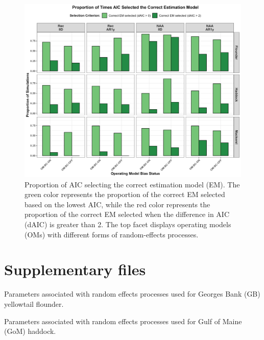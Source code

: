 \documentclass[
  12pt,
]{article}
\begin{document}
\begin{figure}[H]
\centering
\includegraphics[width=\textwidth]{Revised_Figures&Tables/AIC_select.PNG}
\caption{Proportion of AIC selecting the correct estimation model (EM). The green color represents the proportion of the correct EM selected based on the lowest AIC, while the red color represents the proportion of the correct EM selected when the difference in AIC (dAIC) is greater than 2. The top facet displays operating models (OMs) with different forms of random-effects processes.}
\label{fig:AIC_select}
\end{figure}

\section{Supplementary files}\label{supplementary-files}

\renewcommand{\thetable}{S\arabic{table}}
\setcounter{table}{0}

\begin{table}[H]
    \centering
    \caption{Parameters associated with random effects processes used for Georges Bank (GB) yellowtail flounder.}
    \label{supp_flounder_table}
    
\end{table}

\begin{table}[H]
    \centering
    \caption{Parameters associated with random effects processes used for Gulf of Maine (GoM) haddock.}
    \label{supp_haddock_table}
    
\end{table}
\end{document}
